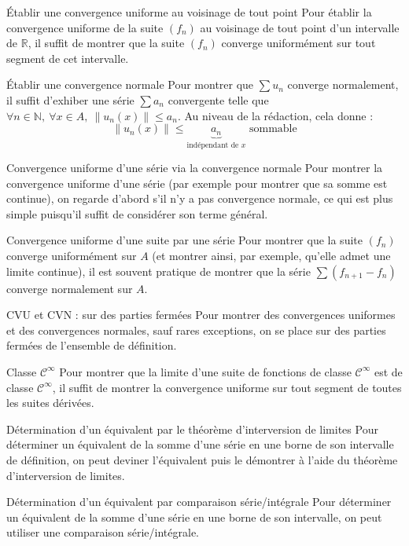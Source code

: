 \documentclass[french]{book}
\newcommand{\N}{\mathbb{N}}
\newcommand{\R}{\mathbb{R}}
\theoremstyle{plain}
\theoremstyle{definition}
\theoremstyle{remark}
\begin{document}
\begin{PM}{Établir une convergence uniforme au voisinage de tout point} Pour établir la convergence uniforme de la suite $(f_n)$ au voisinage de tout point d'un intervalle de $\R$, il suffit de montrer que la suite $(f_n)$ converge uniformément sur tout segment de cet intervalle.
\end{PM}
\begin{PM}{Établir une convergence normale} Pour montrer que $\sum u_n$ converge normalement, il suffit d'exhiber une série $\sum a_n$ convergente telle que $\forall n\in\N,\ \forall x\in A,\ \lVert u_n(x)\rVert\leqslant a_n$. Au niveau de la rédaction, cela donne : $$\lVert u_n(x)\rVert \leqslant \underbrace{a_n}_{\text{indépendant de }x}\text{ sommable}$$
\end{PM}
\begin{PM}{Convergence uniforme d'une série via la convergence normale} Pour montrer la convergence uniforme d'une série (par exemple pour montrer que sa somme est continue), on regarde d'abord s'il n'y a pas convergence normale, ce qui est plus simple puisqu'il suffit de considérer son terme général.
\end{PM}
\begin{PM}{Convergence uniforme d'une suite par une série} Pour montrer que la suite $(f_n)$ converge uniformément sur $A$ (et montrer ainsi, par exemple, qu'elle admet une limite continue), il est souvent pratique de montrer que la série $\sum (f_{n+1}-f_n)$ converge normalement sur $A$.
\end{PM}
\begin{PM}{CVU et CVN : sur des parties fermées} Pour montrer des convergences uniformes et des convergences normales, sauf rares exceptions, on se place sur des parties fermées de l'ensemble de définition.
\end{PM}
\begin{PM}{Classe $\mathcal{C}^\infty$} Pour montrer que la limite d'une suite de fonctions de classe $\mathcal{C}^\infty$ est de classe $\mathcal{C}^\infty$, il suffit de montrer la convergence uniforme sur tout segment de toutes les suites dérivées.
\end{PM}
\begin{PM}{Détermination d'un équivalent par le théorème d'interversion de limites} Pour déterminer un équivalent de la somme d'une série en une borne de son intervalle de définition, on peut deviner l'équivalent puis le démontrer à l'aide du théorème d'interversion de limites.
\end{PM}
\begin{PM}{Détermination d'un équivalent par comparaison série/intégrale} Pour déterminer un équivalent de la somme d'une série en une borne de son intervalle, on peut utiliser une comparaison série/intégrale.
\end{PM}
\end{document}
